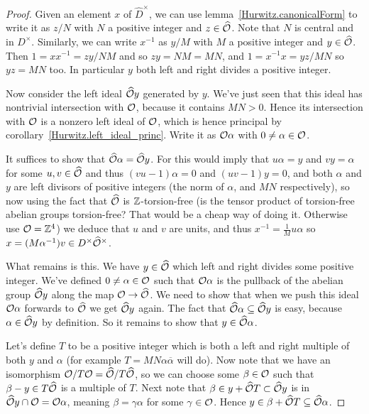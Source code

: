 \begin{proof}
    Given an element $x$ of $\widehat{D}^\times$, we can use lemma~\ref{Hurwitz.canonicalForm}
    to write it as $z/N$ with $N$ a positive integer
    and $z\in\widehat{\mathcal{O}}$. Note that $N$ is central and in $D^\times$. Similarly, we can
    write $x^{-1}$ as $y/M$ with $M$ a positive integer and $y\in\widehat{\mathcal{O}}$. Then
    $1=xx^{-1}=zy/NM$ and so $zy=NM=MN$, and $1=x^{-1}x=yz/MN$ so $yz=MN$ too. In particular $y$
    both left and right divides a positive integer.

    Now consider the left ideal $\widehat{\mathcal{O}}y$ generated by $y$. We've just seen that
    this ideal has nontrivial intersection with $\mathcal{O}$, because it contains $MN>0$. Hence
    its intersection with $\mathcal{O}$ is a nonzero left ideal of $\mathcal{O}$, which is
    hence principal by corollary~\ref{Hurwitz.left_ideal_princ}. Write it as $\mathcal{O}\alpha$
    with $0\not=\alpha\in\mathcal{O}$.

    It suffices to show that $\widehat{\mathcal{O}}\alpha=\widehat{\mathcal{O}} y$. For this would imply that
    $u\alpha=y$ and $vy=\alpha$ for some $u,v\in\widehat{\mathcal{O}}$ and thus $(vu-1)\alpha=0$
    and $(uv-1)y=0$, and both $\alpha$ and $y$ are left divisors of positive integers
    (the norm of $\alpha$, and $MN$ respectively), so now using the fact that $\widehat{\mathcal{O}}$
    is $\mathbb{Z}$-torsion-free (is the tensor product of torsion-free abelian groups torsion-free? That
    would be a cheap way of doing it. Otherwise use $\mathcal{O}=\mathbb{Z}^4$) we deduce that $u$ and $v$
    are units, and thus $x^{-1}=\frac{1}{M}u\alpha$ so $x=(M\alpha^{-1})v\in D^\times\widehat{\mathcal{O}}^\times$.

    What remains is this. We have $y\in\widehat{\mathcal{O}}$ which left and right divides some positive integer.
    We've defined $0\not=\alpha\in\mathcal{O}$ such that $\mathcal{O}\alpha$ is the pullback of the
    abelian group $\widehat{\mathcal{O}} y$ along the map $\mathcal{O}\to\widehat{\mathcal{O}}$. We need to show that when we push
    this ideal $\mathcal{O}\alpha$ forwards to $\widehat{\mathcal{O}}$ we get $\widehat{\mathcal{O}} y$ again. The fact that
    $\widehat{\mathcal{O}}\alpha\subseteq\widehat{\mathcal{O}} y$ is easy, because $\alpha\in\widehat{\mathcal{O}} y$ by definition.
    So it remains to show that $y\in\widehat{\mathcal{O}}\alpha$.

    Let's define $T$ to be a positive integer which is both a left and right multiple of
    both $y$ and $\alpha$ (for example $T=MN\alpha\overline{\alpha}$ will do). Now note that we
    have an isomorphism $\mathcal{O}/T\mathcal{O}=\widehat{\mathcal{O}}/T\widehat{\mathcal{O}}$, so we can choose
    some $\beta\in\mathcal{O}$ such that $\beta-y\in T\widehat{\mathcal{O}}$ is a multiple of $T$. Next note that
    $\beta\in y+\widehat{\mathcal{O}} T\subset \widehat{\mathcal{O}} y$ is in $\widehat{\mathcal{O}} y\cap\mathcal{O}=\mathcal{O}\alpha$, meaning
    $\beta=\gamma\alpha$ for some $\gamma\in\mathcal{O}$.
    Hence $y\in\beta+\widehat{\mathcal{O}} T\subseteq\widehat{\mathcal{O}}\alpha$.
\end{proof}
